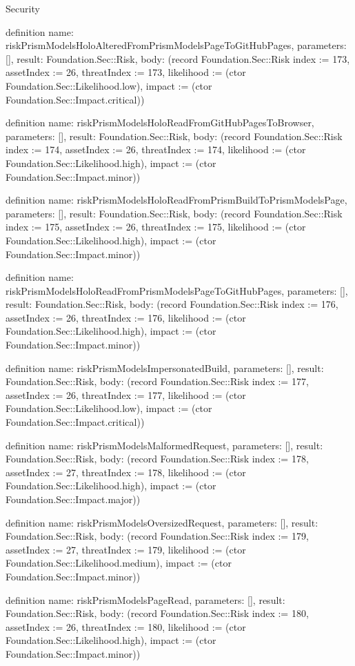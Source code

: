 \begin{lexlean}{Security}
\begin{semanticmodule}
definition{
  name: riskPrismModelsHoloAlteredFromPrismModelsPageToGitHubPages,
  parameters: [],
  result: Foundation.Sec::Risk,
  body: (record Foundation.Sec::Risk {index := 173, assetIndex := 26, threatIndex := 173, likelihood := (ctor Foundation.Sec::Likelihood.low), impact := (ctor Foundation.Sec::Impact.critical)})
}

definition{
  name: riskPrismModelsHoloReadFromGitHubPagesToBrowser,
  parameters: [],
  result: Foundation.Sec::Risk,
  body: (record Foundation.Sec::Risk {index := 174, assetIndex := 26, threatIndex := 174, likelihood := (ctor Foundation.Sec::Likelihood.high), impact := (ctor Foundation.Sec::Impact.minor)})
}

definition{
  name: riskPrismModelsHoloReadFromPrismBuildToPrismModelsPage,
  parameters: [],
  result: Foundation.Sec::Risk,
  body: (record Foundation.Sec::Risk {index := 175, assetIndex := 26, threatIndex := 175, likelihood := (ctor Foundation.Sec::Likelihood.high), impact := (ctor Foundation.Sec::Impact.minor)})
}

definition{
  name: riskPrismModelsHoloReadFromPrismModelsPageToGitHubPages,
  parameters: [],
  result: Foundation.Sec::Risk,
  body: (record Foundation.Sec::Risk {index := 176, assetIndex := 26, threatIndex := 176, likelihood := (ctor Foundation.Sec::Likelihood.high), impact := (ctor Foundation.Sec::Impact.minor)})
}

definition{
  name: riskPrismModelsImpersonatedBuild,
  parameters: [],
  result: Foundation.Sec::Risk,
  body: (record Foundation.Sec::Risk {index := 177, assetIndex := 26, threatIndex := 177, likelihood := (ctor Foundation.Sec::Likelihood.low), impact := (ctor Foundation.Sec::Impact.critical)})
}

definition{
  name: riskPrismModelsMalformedRequest,
  parameters: [],
  result: Foundation.Sec::Risk,
  body: (record Foundation.Sec::Risk {index := 178, assetIndex := 27, threatIndex := 178, likelihood := (ctor Foundation.Sec::Likelihood.high), impact := (ctor Foundation.Sec::Impact.major)})
}

definition{
  name: riskPrismModelsOversizedRequest,
  parameters: [],
  result: Foundation.Sec::Risk,
  body: (record Foundation.Sec::Risk {index := 179, assetIndex := 27, threatIndex := 179, likelihood := (ctor Foundation.Sec::Likelihood.medium), impact := (ctor Foundation.Sec::Impact.minor)})
}

definition{
  name: riskPrismModelsPageRead,
  parameters: [],
  result: Foundation.Sec::Risk,
  body: (record Foundation.Sec::Risk {index := 180, assetIndex := 26, threatIndex := 180, likelihood := (ctor Foundation.Sec::Likelihood.high), impact := (ctor Foundation.Sec::Impact.minor)})
}


\end{semanticmodule}
\end{lexlean}
